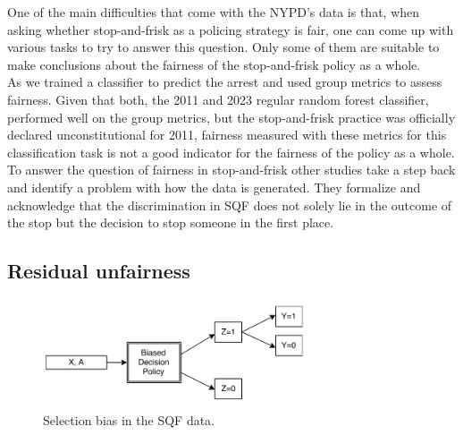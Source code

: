 One of the main difficulties that come with the NYPD's data is that, when asking whether stop-and-frisk as a policing strategy is fair, one can come up with various tasks to try to answer this question. Only some of them are suitable to make conclusions about the fairness of the stop-and-frisk policy as a whole.\\
As \cite{Badr2022DTFANSP} we trained a classifier to predict the arrest and used group metrics to assess fairness. Given that both, the 2011 and 2023 regular random forest classifier, performed well on the group metrics, but the stop-and-frisk practice was officially declared unconstitutional for 2011, fairness measured with these metrics for this classification task is not a good indicator for the fairness of the policy as a whole.\\
To answer the question of fairness in stop-and-frisk other studies take a step back and identify a problem with how the data is generated. They formalize and acknowledge that the discrimination in SQF does not solely lie in the outcome of the stop but the decision to stop someone in the first place.

\subsection{Residual unfairness}
\begin{figure}
    \includegraphics[width=0.7\textwidth]{../figures/selection_bias.png}
    \caption{Selection bias in the SQF data.}
    \label{fig:selection_bias}
\end{figure}

